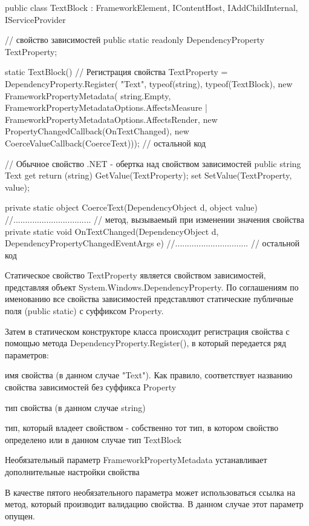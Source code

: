 public class TextBlock : FrameworkElement, IContentHost, IAddChildInternal, IServiceProvider 
{
    // свойство зависимостей
    public static readonly DependencyProperty TextProperty;
 
    static TextBlock()
    {
        // Регистрация свойства
        TextProperty = DependencyProperty.Register(
                    "Text", 
                    typeof(string),
                    typeof(TextBlock),
                    new FrameworkPropertyMetadata(
                        string.Empty, 
                        FrameworkPropertyMetadataOptions.AffectsMeasure |
                        FrameworkPropertyMetadataOptions.AffectsRender, 
                        new PropertyChangedCallback(OnTextChanged), 
                        new CoerceValueCallback(CoerceText)));
        // остальной код
    }
 
    // Обычное свойство .NET  - обертка над свойством зависимостей
    public string Text
    { 
        get { return (string) GetValue(TextProperty); } 
        set { SetValue(TextProperty, value); }
    }  
     
    private static object CoerceText(DependencyObject d, object value)
    {
        //.................................
    }
    // метод, вызываемый при изменении значения свойства 
    private static void OnTextChanged(DependencyObject d, DependencyPropertyChangedEventArgs e)
    { 
        //...............................
    }
    // остальной код
}

Статическое свойство TextProperty является свойством зависимостей, представляя объект System.Windows.DependencyProperty. По соглашениям по именованию все свойства зависимостей представляют статические публичные поля (public static) с суффиксом Property.

Затем в статическом конструкторе класса происходит регистрация свойства с помощью метода DependencyProperty.Register(), в который передается ряд параметров:

имя свойства (в данном случае "Text"). Как правило, соответствует названию свойства зависимостей без суффикса Property

тип свойства (в данном случае string)

тип, который владеет свойством - собственно тот тип, в котором свойство определено или в данном случае тип TextBlock

Необязательный параметр FrameworkPropertyMetadata устанавливает дополнительные настройки свойства

В качестве пятого необязательного параметра может использоваться ссылка на метод, который производит валидацию свойства. В данном случае этот параметр опущен.

